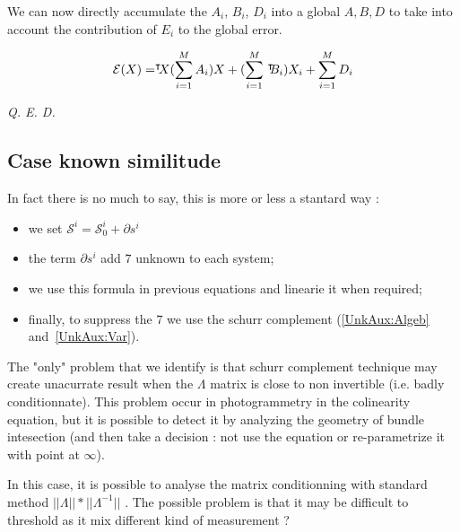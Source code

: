 We can now directly accumulate the $A_i$, $B_i$, $D_i$ into a global $A,B,D$ 
to take into account the contribution of $E_i$ to the global error.

\begin{equation}
    \mathcal{E}(X) =      ^{\intercal} \!\!\! {X}    (\sum\limits_{\substack{i=1 }}^{M} A_i) X  
                     +   (\sum\limits_{\substack{i=1 }}^{M} \, ^{\intercal} \!\! {B_i})   X_i   
                     +  \sum\limits_{\substack{i=1 }}^{M}  D_i
\end{equation}

\begin{center}
    \emph {Q. E. D.}
\end{center}


\subsection{Case known similitude}

In fact there is no much to say, this is more or less a stantard way :

\begin{itemize}
   \item we set $\mathcal{S}^i = \mathcal{S}^i_0 + \partial s^i $
   \item the term $\partial s^i $ add $7$ unknown to each system;
   \item we use this formula in previous equations and linearie it when required;
   \item finally, to suppress the $7$ we use the schurr complement (\ref{UnkAux:Algeb} and~\ref{UnkAux:Var}).
\end{itemize}

The "only" problem that we identify is that schurr complement technique may 
create unacurrate result when the $\Lambda$ matrix is close to non invertible 
(i.e. badly conditionnate).  This problem occur in photogrammetry in the
colinearity equation, but it is possible to detect it by analyzing the geometry
of bundle intesection (and then take a decision : not use the equation or 
re-parametrize it with point at $\infty$).

In this case, it is possible to analyse the matrix conditionning with
standard method $||\Lambda|| * ||\Lambda ^{-1}||$ . The possible problem
is that it may be difficult to threshold as it mix different kind of measurement ?


